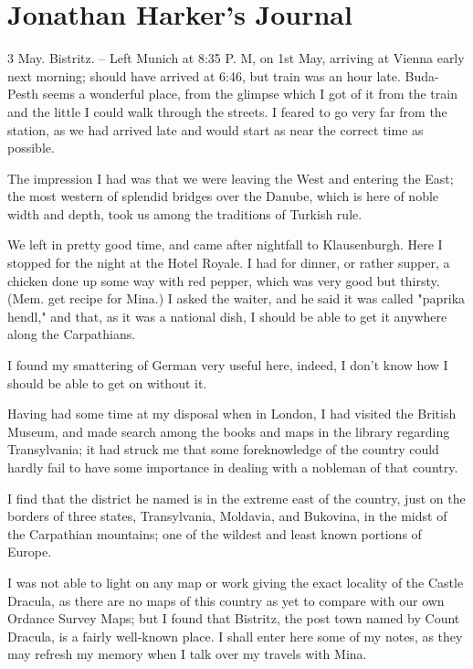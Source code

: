 \chapter{Jonathan Harker's Journal}

3 May. Bistritz. -- Left Munich at 8:35 P. M, on 1st May, arriving at Vienna early next morning; should have arrived at 6:46, but train was an hour late. Buda-Pesth seems a wonderful place, from the glimpse which I got of it from the train and the little I could walk through the streets. I feared to go very far from the station, as we had arrived late and would start as near the correct time as possible. 

The impression I had was that we were leaving the West and entering the East; the most western of splendid bridges over the Danube, which is here of noble width and depth, took us among the traditions of Turkish rule. 

We left in pretty good time, and came after nightfall to Klausenburgh. Here I stopped for the night at the Hotel Royale. I had for dinner, or rather supper, a chicken done up some way with red pepper, which was very good but thirsty. (Mem. get recipe for Mina.) I asked the waiter, and he said it was called "paprika hendl," and that, as it was a national dish, I should be able to get it anywhere along the Carpathians. 

I found my smattering of German very useful here, indeed, I don't know how I should be able to get on without it. 

Having had some time at my disposal when in London, I had visited the British Museum, and made search among the books and maps in the library regarding Transylvania; it had struck me that some foreknowledge of the country could hardly fail to have some importance in dealing with a nobleman of that country. 

I find that the district he named is in the extreme east of the country, just on the borders of three states, Transylvania, Moldavia, and Bukovina, in the midst of the Carpathian mountains; one of the wildest and least known portions of Europe. 

I was not able to light on any map or work giving the exact locality of the Castle Dracula, as there are no maps of this country as yet to compare with our own Ordance Survey Maps; but I found that Bistritz, the post town named by Count Dracula, is a fairly well-known place. I shall enter here some of my notes, as they may refresh my memory when I talk over my travels with Mina. 

